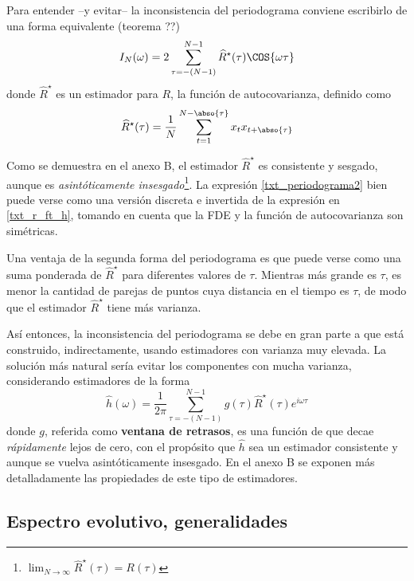 Para entender --y evitar-- la inconsistencia del periodograma conviene escribirlo de una forma
equivalente (teorema ??)
\begin{equation}
I_N(\omega) = 2 \sum_{\tau = -(N-1)}^{N-1} \widehat{R}^{\star}(\tau) \COS{\omega \tau}
\label{txt_periodograma2}
\end{equation}
%
donde $\widehat{R}^{\star}$ es un estimador para $R$, la función de autocovarianza, 
definido como
\begin{equation}
\widehat{R}^{\star} (\tau) = \frac{1}{N} \sum_{t = 1}^{N-\abso{\tau}} x_t x_{t+\abso{\tau}}
\end{equation}

Como se demuestra en el anexo B, el estimador $\widehat{R}^{\star}$ es consistente y sesgado, aunque
es \textit{asintóticamente insesgado}\footnote{$\lim_{N\rightarrow \infty} 
\widehat{R}^{\star}(\tau) = R(\tau)$}.
%
La expresión \ref{txt_periodograma2} bien puede verse como una versión discreta e invertida de la 
expresión en \ref{txt_r_ft_h}, tomando en cuenta que la FDE y la función de autocovarianza son 
simétricas. 

Una ventaja de la segunda forma del periodograma es que puede verse como una suma ponderada de 
$\widehat{R}^{\star}$ para diferentes valores de $\tau$. 
Mientras más grande es $\tau$, es menor la cantidad de parejas de puntos cuya distancia en el 
tiempo es $\tau$, de modo que el estimador $\widehat{R}^{\star}$ tiene más varianza. 

Así entonces, la inconsistencia del periodograma se debe en gran parte a que está construido,
indirectamente, usando estimadores con varianza muy elevada.
La solución más natural sería evitar los componentes con mucha varianza, considerando estimadores de 
la forma
%
\begin{equation}
\widehat{h}(\omega) = \frac{1}{2 \pi} \sum_{\tau = -(N-1)}^{N-1} g(\tau) \widehat{R}^{\star}(\tau) 
e^{i \omega \tau} 
\label{txt_estimador}
\end{equation}
%
donde $g$, referida como \textbf{ventana de retrasos}, es una función de que decae 
\textit{rápidamente} lejos de cero, con el propósito que $\widehat{h}$ sea un estimador
consistente y aunque se vuelva asintóticamente insesgado.
%
En el anexo B se exponen más detalladamente las propiedades de este tipo de estimadores.


\subsection{Espectro evolutivo, generalidades}

